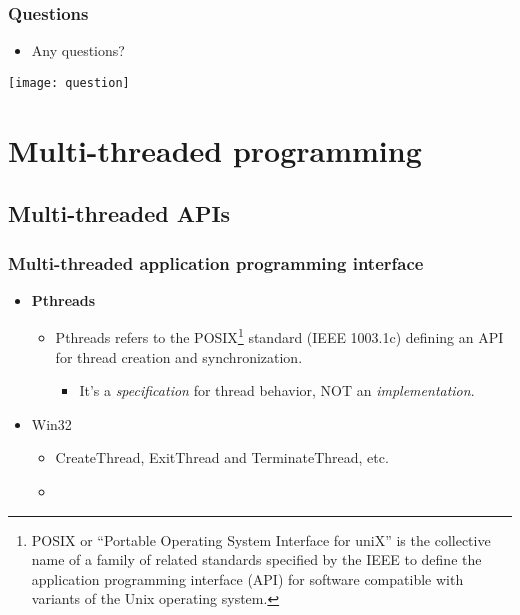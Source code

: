 \documentclass[CJKutf8,xcolor=pdftex,dvipsnames,table]{beamer}
\begin{document}
\begin{CJK*}{UTF8}{song}
  \fi

  \begin{frame}
  \frametitle{Questions}
  \begin{itemize}
  \item{Any questions?}
  \end{itemize}
  \begin{center}
    \texttt{[image: question]}
  \end{center}
  \end{frame}

  \fi

  \section{Multi-threaded programming}

\iffalse

  \begin{frame}
  \frametitle{Multi-threaded programming} \pause
  \begin{itemize}
  \item{Application programming interfaces (APIs)} \pause
  \item{Writing multi-threaded code}
  \end{itemize}
  \end{frame}

\fi

  \subsection{Multi-threaded APIs}

  \begin{frame}
  \frametitle{Multi-threaded application programming interface} \pause
  \begin{itemize}
  \item{\textbf{Pthreads}} \pause
    \begin{itemize}
    \item{Pthreads refers to the POSIX\footnote{POSIX or ``Portable Operating System Interface for uniX'' is the collective name of a family of related standards specified by the IEEE to define the application programming interface (API) for software compatible with variants of the Unix operating system.} standard (IEEE 1003.1c) defining an API for thread creation and synchronization.} \pause
      \begin{itemize}
      \item{It's a \emph{specification} for thread behavior, NOT an \emph{implementation}.} \pause
      \end{itemize}
    \end{itemize}
  \item{Win32} \pause
    \begin{itemize}
    \item{CreateThread, ExitThread and TerminateThread, etc.} \pause
    \item{}
    \end{itemize}
  \end{itemize}
  \end{frame}


\end{CJK*}
\end{document}
